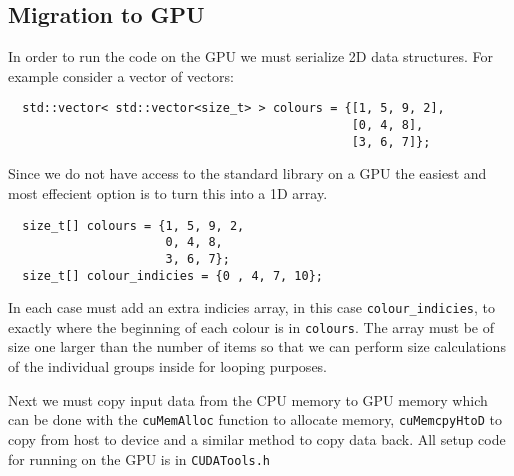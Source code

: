 \subsection*{Migration to GPU}
In order to run the code on the GPU we must serialize 2D data structures. For example consider a vector of vectors:
\begin{verbatim}
  std::vector< std::vector<size_t> > colours = {[1, 5, 9, 2],
                                                [0, 4, 8],
                                                [3, 6, 7]};
\end{verbatim}
Since we do not have access to the standard library on a GPU the easiest and most effecient option is to turn this into a 1D array.
\begin{verbatim}
  size_t[] colours = {1, 5, 9, 2,
                      0, 4, 8,
                      3, 6, 7};
  size_t[] colour_indicies = {0 , 4, 7, 10};
\end{verbatim}
In each case must add an extra indicies array, in this case \verb!colour_indicies!, to exactly where the beginning of each colour is in \verb!colours!. The array must be of size one larger than the number of items so that we can perform size
calculations of the individual groups inside for looping purposes.

Next we must copy input data from the CPU memory to GPU memory which can be done with the \verb!cuMemAlloc! function to allocate memory, \verb!cuMemcpyHtoD! to copy from host to device and a similar method to copy data back. All setup code for running on the GPU is in \verb!CUDATools.h!

